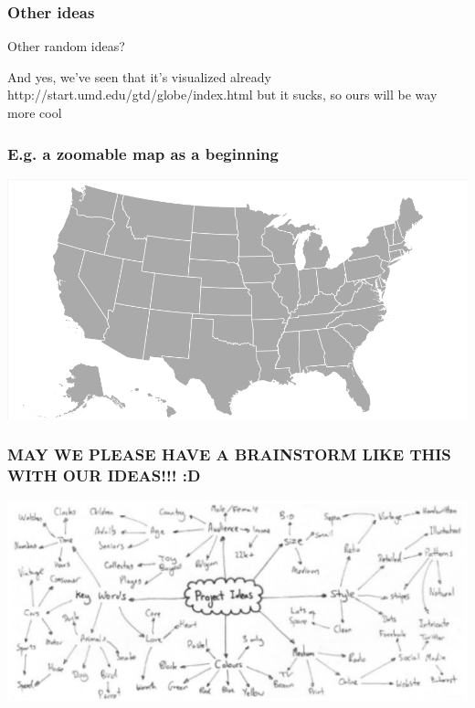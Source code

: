   \begin{frame}
    \frametitle{Other ideas}
    
    Other random ideas?
 
    And yes, we've seen that it's visualized already http://start.umd.edu/gtd/globe/index.html but it sucks, so ours will be way more cool

  \end{frame}



  \begin{frame}
    \frametitle{E.g. a zoomable map as a beginning}
    
    \includegraphics[width=\textwidth]{Figures/zoomable_map.png}


  \end{frame}




  \begin{frame}
    \frametitle{MAY WE PLEASE HAVE A BRAINSTORM LIKE THIS WITH OUR IDEAS!!! :D }
    
    \includegraphics[width=\textwidth]{Figures/project_ideas.png}


  \end{frame}



